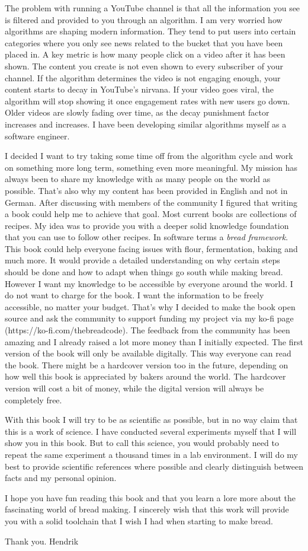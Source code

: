 The problem with running a YouTube channel is that all the information
you see is filtered and provided to you through an algorithm. I am very
worried how algorithms are shaping modern information. They tend to
put users into certain categories where you only see news related
to the bucket that you have been placed in. A key metric is how many
people click on a video after it has been shown. The content you create
is not even shown to every subscriber of your channel. If the algorithm
determines the video is not engaging enough, your content starts to
decay in YouTube's nirvana. If your video goes viral, the algorithm
will stop showing it once engagement rates with new users go down.
Older videos are slowly fading over time, as the decay punishment
factor increases and increases. I have been developing similar algorithms
myself as a software engineer.

I decided I want to try taking some time off from the algorithm cycle and
work on something more long term, something even more meaningful.
My mission has always been to share my knowledge with as many people
on the world as possible. That's also why my content has been provided
in English and not in German. After discussing with members of the community
I figured that writing a book could help me to achieve that goal. Most
current books are collections of recipes. My idea was to provide you
with a deeper solid knowledge foundation that you can use to follow other recipes.
In software terms a {\it bread framework}. This book could help everyone
facing issues with flour, fermentation, baking and much more. It would provide
a detailed understanding on why certain steps should be done and how to
adapt when things go south while making bread.  However
I want my knowledge to be accessible by everyone around the world. I do
not want to charge for the book. I want the information to be freely accessible,
no matter your budget. That's why I decided to make the book open source
and ask the community to support funding my project via my ko-fi page
(https://ko-fi.com/thebreadcode).
The feedback from the community has been amazing and I already raised
a lot more money than
I initially expected. The first version of the book will only be available
digitally. This way everyone can read the book. There might be a hardcover
version too in the future, depending on how well this book is appreciated
by bakers around the world. The hardcover version will cost a bit of money,
while the digital version will always be completely free.

With this book I will try to be as scientific as possible, but in no way
claim that this is a work of science. I have conducted several experiments
myself that I will show you in this book. But to call this science, you would
probably need to repeat the same experiment a thousand times in a lab
environment. I will do my best to provide scientific references where possible
and clearly distinguish between facts and my personal opinion.

I hope you have fun reading this book and that you learn a lore more about
the fascinating world of bread making. I sincerely wish that this work
will provide you with a solid toolchain that I wish I had when starting
to make bread.

Thank you.
Hendrik
